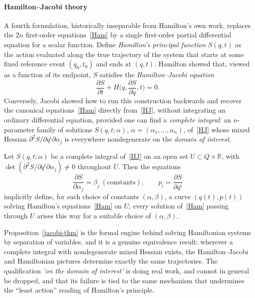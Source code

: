 \paragraph{Hamilton--Jacobi theory}
A fourth formulation, historically inseparable from Hamilton's own work,
replaces the $2n$ first-order equations~\eqref{Ham} by a single first-order
partial differential equation for a scalar function. Define \emph{Hamilton's
principal function} $S(q,t)$ as the action evaluated along the true trajectory
of the system that starts at some fixed reference event $(q_0,t_0)$ and ends at
$(q,t)$. Hamilton showed that, viewed as a function of its endpoint, $S$
satisfies the \emph{Hamilton--Jacobi equation}
\begin{equation}
\label{HJ}
\frac{\partial S}{\partial t}+H\Big(q,\frac{\partial S}{\partial q},t\Big)=0.
\end{equation}
Conversely, Jacobi showed how to run this construction backwards and recover
the canonical equations~\eqref{Ham} directly from~\eqref{HJ}, without
integrating an ordinary differential equation, provided one can find a
\emph{complete integral}: an $n$-parameter family of solutions $S(q,t;\alpha)$,
$\alpha=(\alpha_1,\dots,\alpha_n)$, of~\eqref{HJ} whose mixed Hessian
$\partial^2 S/\partial q^i\partial \alpha_j$ is everywhere nondegenerate on the
\emph{domain of interest}.

\begin{proposition}
\label{jacobi-thm}
Let $S(q,t;\alpha)$ be a complete integral of~\eqref{HJ} on an open set
    $U\subset Q\times\mathbb{R}$, with $\det(\partial^2 S/\partial
    q^i\partial\alpha_j)\neq 0$ throughout $U$. Then the equations
\begin{equation}
\frac{\partial S}{\partial\alpha_j} = \beta_j \ (\text{constants}), 
    \qquad p_i = \frac{\partial S}{\partial q^i}
\end{equation}
implicitly define, for each choice of constants $(\alpha,\beta)$, a curve
    $(q(t),p(t))$ solving Hamilton's equations~\eqref{Ham} on $U$; every
    solution of~\eqref{Ham} passing through $U$ arises this way for a suitable
    choice of $(\alpha,\beta)$.
\end{proposition}

Proposition~\ref{jacobi-thm} is the formal engine behind solving
Hamiltonian systems by separation of variables, and it is a genuine equivalence
result: wherever a complete integral with nondegenerate mixed Hessian exists,
the Hamilton--Jacobi and Hamiltonian pictures determine exactly the same
trajectories. The qualification \emph{'on the domain of interest'} is doing real
work, and  cannot in general be
dropped, and that its failure is tied to the same mechanism that undermines the
``least action'' reading of Hamilton's principle.

